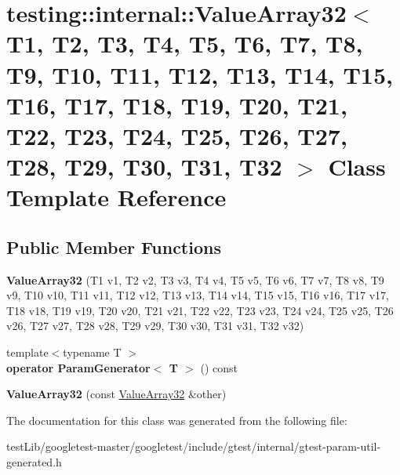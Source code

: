 \hypertarget{classtesting_1_1internal_1_1ValueArray32}{}\section{testing\+:\+:internal\+:\+:Value\+Array32$<$ T1, T2, T3, T4, T5, T6, T7, T8, T9, T10, T11, T12, T13, T14, T15, T16, T17, T18, T19, T20, T21, T22, T23, T24, T25, T26, T27, T28, T29, T30, T31, T32 $>$ Class Template Reference}
\label{classtesting_1_1internal_1_1ValueArray32}
\subsection*{Public Member Functions}
\begin{DoxyCompactItemize}
\item 
\mbox{\label{classtesting_1_1internal_1_1ValueArray32_ad5b6e2ff644e170bda8bf67ef8283c5a}} 
{\bfseries Value\+Array32} (T1 v1, T2 v2, T3 v3, T4 v4, T5 v5, T6 v6, T7 v7, T8 v8, T9 v9, T10 v10, T11 v11, T12 v12, T13 v13, T14 v14, T15 v15, T16 v16, T17 v17, T18 v18, T19 v19, T20 v20, T21 v21, T22 v22, T23 v23, T24 v24, T25 v25, T26 v26, T27 v27, T28 v28, T29 v29, T30 v30, T31 v31, T32 v32)
\item 
\mbox{\label{classtesting_1_1internal_1_1ValueArray32_a03c8932477b8fe28b2800393a23e4e13}} 
{\footnotesize template$<$typename T $>$ }\\{\bfseries operator Param\+Generator$<$ T $>$} () const
\item 
\mbox{\label{classtesting_1_1internal_1_1ValueArray32_aa64bff75279681235a4289e49ca9c2aa}} 
{\bfseries Value\+Array32} (const \hyperlink{classtesting_1_1internal_1_1ValueArray32}{Value\+Array32} \&other)
\end{DoxyCompactItemize}


The documentation for this class was generated from the following file\+:\begin{DoxyCompactItemize}
\item 
test\+Lib/googletest-\/master/googletest/include/gtest/internal/gtest-\/param-\/util-\/generated.\+h\end{DoxyCompactItemize}

